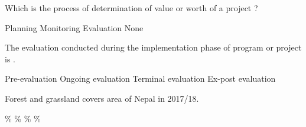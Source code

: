 \begin{questions}
\question Which is the process of determination of value or worth of a project ?
\begin{choices}
\choice Planning
\choice Monitoring
\choice Evaluation
\choice None
\end{choices}

\question The evaluation conducted during the implementation phase of program or project is \fillin[][3cm].
\begin{choices}
\choice Pre-evaluation
\choice Ongoing evaluation
\choice Terminal evaluation
\choice Ex-post evaluation
\end{choices}

\question Forest and grassland covers \fillin[][3cm] area of Nepal in 2017/18.
\begin{choices}
\%
\%
\%
\%
\end{choices}

\end{questions}
